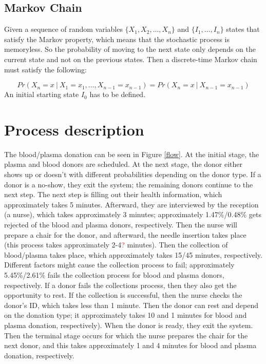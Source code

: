 \documentclass[a4paper,12pt]{article}
\begin{document}
\bigbreak
\subsection*{Markov Chain}

Given a sequence of random variables $\{X_1,X_2,...,X_n\}$ and $\{I_1,\dots,I_n\}$ states that satisfy the Markov property, which means that the stochastic process is memoryless. So the probability of moving to the next state only depends on the current state and not on the previous states. Then a discrete-time Markov chain must satisfy the following:

\[ Pr(X_{n} = x \ | \ X_1 = x_1, \dots , X_{n-1} = x_{n-1}) = Pr(X_{n} = x \ | \ X_{n-1} = x_{n-1}) 
\]
An initial starting state $I_0$ has to be defined.
\section*{Process description}
The blood/plasma donation can be seen in Figure \ref{flow}. At the initial stage, the plasma and blood donors are scheduled. At the next stage, the donor either shows up or doesn't with different probabilities depending on the donor type. If a donor is a no-show, they exit the system; the remaining donors continue to the next step. The next step is filling out their health information, which approximately takes 5 minutes. Afterward, they are interviewed by the reception (a nurse), which takes approximately 3 minutes; approximately 1.47\%/0.48\% gets rejected of the blood and plasma donors, respectively. Then the nurse will prepare a chair for the donor, and afterward, the needle insertion takes place (this process takes approximately 2-4\textcolor{red}{?} minutes). Then the collection of blood/plasma takes place, which approximately takes 15/45 minutes, respectively. Different factors might cause the collection process to fail; approximately 5.45\%/2.61\% fails the collection process for blood and plasma donors, respectively. If a donor fails the collections process, then they also get the opportunity to rest. If the collection is successful, then the nurse checks the donor's ID, which takes less than 1 minute. Then the donor can rest and depend on the donation type; it approximately takes 10 and 1 minutes for blood and plasma donation, respectively). When the donor is ready, they exit the system. Then the terminal stage occurs for which the nurse prepares the chair for the next donor, and this takes approximately 1 and 4 minutes for blood and plasma donation, respectively.
\end{document}
